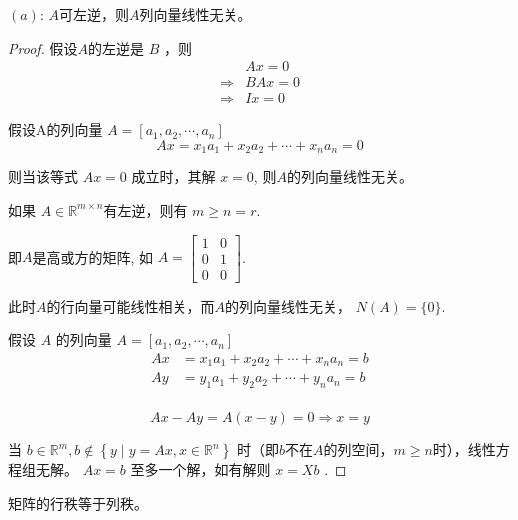 \begin{theorem}
    $(a)$: $A$可左逆，则$A$列向量线性无关。
\end{theorem}

\begin{proof}
    假设$A$的左逆是 $ B $ ，则
    $$
    \begin{aligned}
            & A x=0 \\
     \Rightarrow &B A x=0 \\
    \Rightarrow & I x=0
    \end{aligned}
    $$

    假设A的列向量 $ A=\left[a_{1}, a_{2}, \cdots, a_{n}\right] $
    $$
    A x=x_{1} a_{1}+x_{2} a_{2}+\cdots+x_{n} a_{n}=0
    $$

    则当该等式 $ A x=0 $ 成立时，其解 $ x=0 $, 则$A$的列向量线性无关。  
    
    \begin{corollary}
        如果 $ A \in \mathbb{R}^{m \times n} $有左逆，则有 $ m \geq n = r $. 

    即$A$是高或方的矩阵, 如 $ A=\left[\begin{array}{ll}1 & 0 \\ 0 & 1 \\ 0 & 0\end{array}\right] $. 
    
    此时$A$的行向量可能线性相关，而$A$的列向量线性无关， $N(A) = \{0\}$.
    \end{corollary}
    

    假设 $ A $ 的列向量 $ A=\left[a_{1}, a_{2}, \cdots, a_{n}\right] $
    $$
    \begin{aligned}
         A x&=x_{1} a_{1}+x_{2} a_{2}+\cdots+x_{n} a_{n}=b \\
    A y&=y_{1} a_{1}+y_{2} a_{2}+\cdots+y_{n} a_{n}=b \\
    \end{aligned}
    $$

    $$A x-A y=A(x-y)=0 \Rightarrow x=y$$

    当 $ b \in \mathbb{R}^{m}, b \notin\left\{y \mid y=A x, x \in \mathbb{R}^{n}\right\} $ 时（即$b$不在$A$的列空间，$ m \geq n  $时），线性方程组无解。  $ A x=b $ 至多一个解，如有解则 $ x=X b $ . 
\end{proof}

\begin{theorem}
    矩阵的行秩等于列秩。
\end{theorem}

